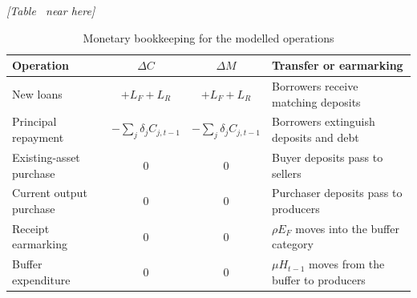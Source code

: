 \begingroup
\def\ThisCaption{Monetary bookkeeping for the modelled operations}
\ifdefined\SeparateArtwork
\par{}\noindent\begin{minipage}{\linewidth}
\captionsetup{type=table}
\caption{\ThisCaption}
\label{tab:bookkeeping}
\centering\small\itshape [Table \thetable\ near here]\par
\end{minipage}\par{}
\else
\begin{table}[hbp]
\centering
\caption{\ThisCaption}
\label{tab:bookkeeping}
\small
\begin{tabularx}{\linewidth}{@{}l c c X@{}}
\toprule
Operation & $\Delta C$ & $\Delta M$ & Transfer or earmarking\\
\midrule
New loans & $+L_F+L_R$ & $+L_F+L_R$ & Borrowers receive matching deposits\\
Principal repayment & $-\sum_j\delta_jC_{j,t-1}$ & $-\sum_j\delta_jC_{j,t-1}$ & Borrowers extinguish deposits and debt\\
Existing-asset purchase & $0$ & $0$ & Buyer deposits pass to sellers\\
Current output purchase & $0$ & $0$ & Purchaser deposits pass to producers\\
Receipt earmarking & $0$ & $0$ & $\rho E_F$ moves into the buffer category\\
Buffer expenditure & $0$ & $0$ & $\mu H_{t-1}$ moves from the buffer to producers\\
\bottomrule
\end{tabularx}
\end{table}
\fi
\endgroup
